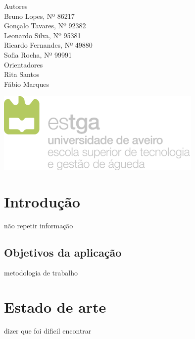 \documentclass[11pt, twoside]{report}
\begin{document}
\begin{titlepage}
		
		
		\large
		Autores\\
		Bruno Lopes, Nº 86217 \\
		Gonçalo Tavares, Nº 92382  \\
		Leonardo Silva, Nº 95381 \\
		Ricardo Fernandes, Nº 49880  \\
		Sofia Rocha, Nº 99991 \\
		
		\vspace{1cm}
		Orientadores\\
		Rita Santos \\
		Fábio Marques\\
		\vspace{4cm}
		
		\centering
		\includegraphics[width=10cm]{image/AssB_vertical_cor}
		
	\end{titlepage}

	\newpage
	\setcounter{page}{1} %
	\tableofcontents %
	\thispagestyle{plain} %
	\thispagestyle{empty} %
	\newpage
	\listoftables %
	\newpage
	\listoffigures %
	
	\newpage
	
	\chapter{Introdução}
	não repetir informação
	\section{Objetivos da aplicação}
	metodologia de trabalho
	
	\chapter{Estado de arte}
	dizer que foi dificil encontrar
	
\end{document}
